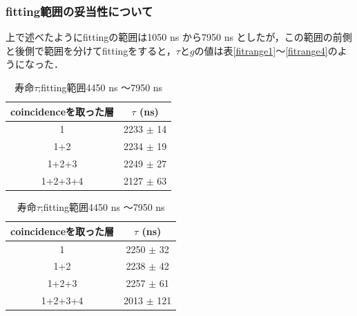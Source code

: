     \subsubsection{fitting範囲の妥当性について}
  上で述べたようにfittingの範囲は1050 ns から7950 ns としたが，この範囲の前側と後側で範囲を分けてfittingをすると，$\tau$と$g$の値は表\ref{fitrange1}〜\ref{fitrange4}のようになった．
  \begin{table}[H]
   \centering
   \begin{minipage}{0.4\columnwidth}
   \caption{寿命$\tau$;fitting範囲1050 ns 〜4550 ns }
   \label{fitrange1}
   \begin{center}
    \begin{tabular}{cc}\toprule
     coincidenceを取った層 & $\tau$ (ns) \\ \midrule
     1 			   & 2233 $\pm$ 14 \\
     1+2 		   & 2234 $\pm$ 19 \\
     1+2+3 		   & 2249 $\pm$ 27 \\
     1+2+3+4 	           & 2127 $\pm$ 63 \\ \bottomrule
    \end{tabular}
   \end{center}
   \end{minipage}
   \hspace*{5mm}
   \begin{minipage}{0.4\columnwidth}
    \caption{寿命$\tau$;fitting範囲4450 ns 〜7950 ns }
    \label{fitrange2}
    \begin{center}
     \begin{tabular}{cc}\toprule
      coincidenceを取った層 & $\tau$ (ns) \\ \midrule
      1 			   & 2250 $\pm$ 32 \\
      1+2 		   & 2238 $\pm$ 42 \\
      1+2+3 		   & 2257 $\pm$ 61 \\
      1+2+3+4 		   & 2013 $\pm$ 121 \\ \bottomrule
     \end{tabular}
    \end{center}   
   \end{minipage}
  \end{table}%

